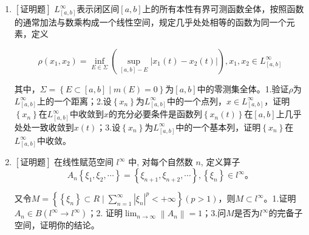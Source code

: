 \documentclass{article}
\begin{document}
\begin{enumerate}
    \item $\left[\textbf{证明题}\right]$ $L_{[a, b]}^{\infty}$表示闭区间$[a, b]$上的所有本性有界可测函数全体，按照函数的通常加法与数乘构成一个线性空间，规定几乎处处相等的函数为同一个元素，定义

    $$
    \rho(x_1, x_2)=\inf_{E\in \Sigma}\left(\sup_{[a, b]-E}\left|x_1(t) - x_2(t) \right|\right), x_1, x_2 \in L_{[a, b]}^{\infty}
    $$

    其中，$\Sigma=\left\{E\subset [a, b] \mid m(E)=0 \right\}$为$[a, b]$中的零测集全体。1.验证$\rho$为$L_{[a, b]}^{\infty}$上的一个距离；2.设$\left\{x_n\right\}$为$L_{[a, b]}^{\infty}$中的一个点列，$x\in L_{[a, b]}^{\infty}$，证明$\left\{x_n\right\}$在$L_{[a, b]}^{\infty}$中收敛到$x$的充分必要条件是函数列$\left\{x_n(t)\right\}$在$[a, b]$上几乎处处一致收敛到$x(t)$；3.设$\left\{x_n\right\}$为$L_{[a, b]}^{\infty}$中的一个基本列，证明$\left\{x_n\right\}$在$L_{[a, b]}^{\infty}$中收敛。

    
    \item $\left[\textbf{证明题}\right]$ 在线性赋范空间 $l^{\infty}$ 中, 对每个自然数 $n$, 定义算子
$$
A_n\left\{\xi_1, \xi_2, \cdots\right\}=\left\{\xi_{n+1}, \xi_{n+2}, \cdots\right\},\left\{\xi_n\right\} \in l^{\infty} 。
$$

又令$M=\left\{\left\{\xi_n\right\} \subset R\mid \sum_{n=1}^{\infty}\left| \xi_n \right|^p <+\infty \right\}(p > 1)$，则$M\subset l^{\infty}$。1.证明$A_n \in B\left(l^{\infty} \rightarrow l^{\infty}\right)$；2. 证明$\lim _{n \rightarrow \infty}\left\|A_n\right\|=1$；3.问$M$是否为$l^{\infty}$的完备子空间，证明你的结论。


\end{enumerate}
\end{document}
